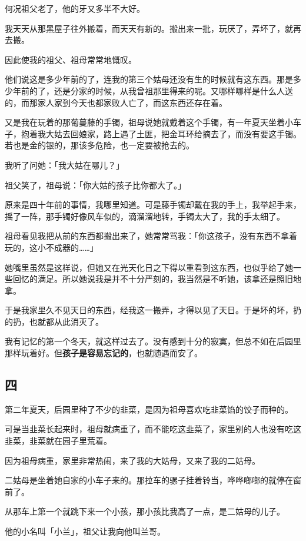 \documentclass[UTF8]{ctexart}
\begin{document}
何况祖父老了，他的牙又多半不大好。

我天天从那黑屋子往外搬着，而天天有新的。搬出来一批，玩厌了，弄坏了，就再去搬。

因此使我的祖父、祖母常常地慨叹。

他们说这是多少年前的了，连我的第三个姑母还没有生的时候就有这东西。那是多少年前的了，还是分家的时候，从我曾祖那里得来的呢。又哪样哪样是什么人送的，而那家人家到今天也都家败人亡了，而这东西还存在着。

又是我在玩着的那葡蔓藤的手镯，祖母说她就戴着这个手镯，有一年夏天坐着小车子，抱着我大姑去回娘家，路上遇了土匪，把金耳环给摘去了，而没有要这手镯。若也是金的银的，那该多危险，也一定要被抢去的。

我听了问她：「我大姑在哪儿？」

祖父笑了，祖母说：「你大姑的孩子比你都大了。」

原来是四十年前的事情，我哪里知道。可是藤手镯却戴在我的手上，我举起手来，摇了一阵，那手镯好像风车似的，滴溜溜地转，手镯太大了，我的手太细了。

祖母看见我把从前的东西都搬出来了，她常常骂我：「你这孩子，没有东西不拿着玩的，这小不成器的……」

她嘴里虽然是这样说，但她又在光天化日之下得以重看到这东西，也似乎给了她一些回忆的满足。所以她说我是并不十分严刻的，我当然是不听她，该拿还是照旧地拿。

于是我家里久不见天日的东西，经我这一搬弄，才得以见了天日。于是坏的坏，扔的扔，也就都从此消灭了。

我有记忆的第一个冬天，就这样过去了。没有感到十分的寂寞，但总不如在后园里那样玩着好。但\textbf{孩子是容易忘记的}，也就随遇而安了。

\subsection{四}

第二年夏天，后园里种了不少的韭菜，是因为祖母喜欢吃韭菜馅的饺子而种的。

可是当韭菜长起来时，祖母就病重了，而不能吃这韭菜了，家里别的人也没有吃这韭菜，韭菜就在园子里荒着。

因为祖母病重，家里非常热闹，来了我的大姑母，又来了我的二姑母。

二姑母是坐着她自家的小车子来的。那拉车的骡子挂着铃当，哗哗啷啷的就停在窗前了。

从那车上第一个就跳下来一个小孩，那小孩比我高了一点，是二姑母的儿子。

他的小名叫「小兰」，祖父让我向他叫兰哥。
\end{document}
